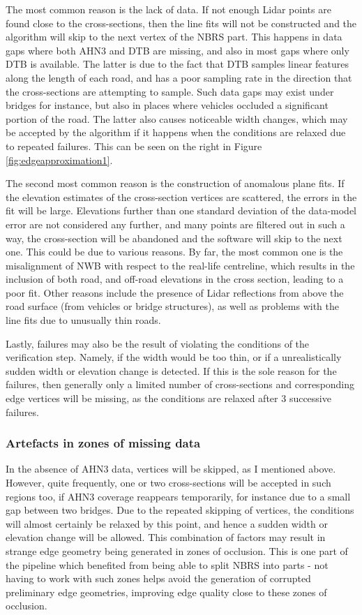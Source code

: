 The most common reason is the lack of data. If not enough Lidar points are found close to the cross-sections, then the line fits will not be constructed and the algorithm will skip to the next vertex of the NBRS part. This happens in data gaps where both AHN3 and DTB are missing, and also in most gaps where only DTB is available. The latter is due to the fact that DTB samples linear features along the length of each road, and has a poor sampling rate in the direction that the cross-sections are attempting to sample. Such data gaps may exist under bridges for instance, but also in places where vehicles occluded a significant portion of the road. The latter also causes noticeable width changes, which may be accepted by the algorithm if it happens when the conditions are relaxed due to repeated failures. This can be seen on the right in Figure \ref{fig:edgeapproximation1}.

The second most common reason is the construction of anomalous plane fits. If the elevation estimates of the cross-section vertices are scattered, the errors in the fit will be large. Elevations further than one standard deviation of the data-model error are not considered any further, and many points are filtered out in such a way, the cross-section will be abandoned and the software will skip to the next one. This could be due to various reasons. By far, the most common one is the misalignment of NWB with respect to the real-life centreline, which results in the inclusion of both road, and off-road elevations in the cross section, leading to a poor fit. Other reasons include the presence of Lidar reflections from above the road surface (from vehicles or bridge structures), as well as problems with the line fits due to unusually thin roads.

Lastly, failures may also be the result of violating the conditions of the verification step. Namely, if the width would be too thin, or if a unrealistically sudden width or elevation change is detected. If this is the sole reason for the failures, then generally only a limited number of cross-sections and corresponding edge vertices will be missing, as the conditions are relaxed after 3 successive failures.

\subsubsection{Artefacts in zones of missing data}

In the absence of AHN3 data, vertices will be skipped, as I mentioned above. However, quite frequently, one or two cross-sections will be accepted in such regions too, if AHN3 coverage reappears temporarily, for instance due to a small gap between two bridges. Due to the repeated skipping of vertices, the conditions will almost certainly be relaxed by this point, and hence a sudden width or elevation change will be allowed. This combination of factors may result in strange edge geometry being generated in zones of occlusion. This is one part of the pipeline which benefited from being able to split NBRS into parts - not having to work with such zones helps avoid the generation of corrupted preliminary edge geometries, improving edge quality close to these zones of occlusion.

